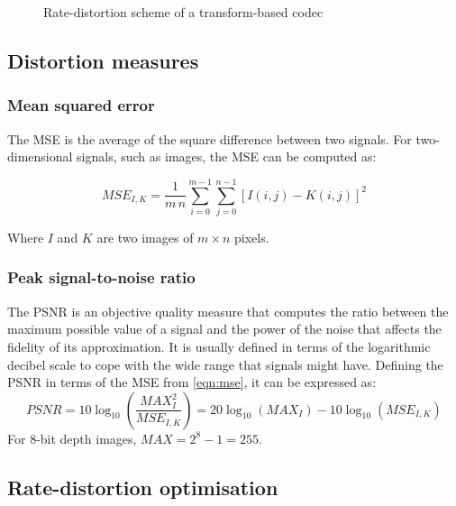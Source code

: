 \documentclass[11pt,a4paper,openright,twoside]{book}
\numberwithin{equation}{section} %
\begin{document}
\begin{figure}[tb]
	\centering
	
	\caption{Rate-distortion scheme of a transform-based codec}
	\label{fig:rate_distortion_scheme}
\end{figure}

\subsection{Distortion measures}
\label{sub:distortion_measures}

\subsubsection{Mean squared error}
\label{ssub:mean_squared_error}

The \ac{MSE} is the average of the square difference between two
signals.
For two-dimensional signals, such as images, the \ac{MSE} can be computed as:

\begin{equation}
	MSE_{I,K} = \frac{1}{m\,n} \sum\limits_{i=0}^{m-1} \sum\limits_{j=0}^{n-1}
	{\left[ I(i,j) - K(i,j) \right]} ^2
	\label{eqn:mse}
\end{equation}

Where $I$ and $K$ are two images of $m \times n$ pixels.

\subsubsection{Peak signal-to-noise ratio}
\label{ssub:peak_signal_to_noise_ratio}

The \ac{PSNR} is an objective quality measure that computes the ratio
between the maximum possible value of a signal and the power of the
noise that affects the fidelity of its approximation.
It is usually defined in terms of the logarithmic decibel scale to cope
with the wide range that signals might have.
Defining the \ac{PSNR} in terms of the \ac{MSE} from
\eqref{eqn:mse}, it can be expressed as:
\begin{equation}
	PSNR = 10 \log_{10} \left(\frac{MAX_I^2}{MSE_{I,K}}\right)
	= 20 \log_{10} (MAX_I) - 10 \log_{10} (MSE_{I,K})
	\label{eqn:psnr}
\end{equation}
For 8-bit depth images, $MAX = 2^{8} - 1 = 255$.

\subsection{Rate-distortion optimisation}
\label{sub:rate_distortion_optimisation}
\end{document}
